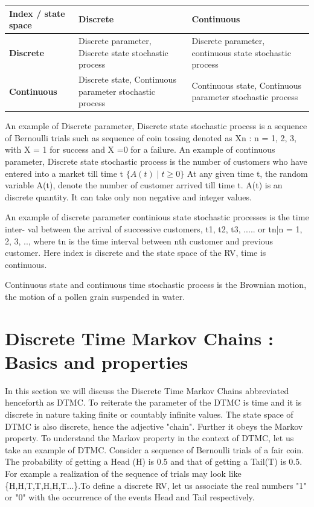 \begin{center}
 \begin{tabular}{||p{3cm}|p{5cm}|p{5cm}||} 
 \hline
 \textbf{Index / state space} & \textbf{Discrete} & \textbf{Continuous} \\ [0.5ex] 
 \hline\hline
 \textbf{Discrete} & Discrete parameter, Discrete state stochastic process & Discrete parameter,  continuous state stochastic process  \\ 
 \hline
 \textbf{Continuous} & Discrete state, Continuous parameter stochastic process & Continuous state, Continuous parameter stochastic process  \\
 \hline

 
\end{tabular}
\end{center}
An example of  Discrete parameter, Discrete state stochastic process is a sequence of Bernoulli trials such as sequence of coin tossing denoted as
{Xn : n = 1, 2, 3}, with X = 1 for success and X =0 for a failure.
An example of  continuous  parameter, Discrete state stochastic process   is  the number of customers who have entered into a market till time t
$\{A(t) \mid t \ge 0\}$
At any given time t, the random variable A(t), denote the number of customer arrived till time
t. A(t) is an discrete quantity. It can take only non negative and integer values.

An example of discrete parameter continious state stochastic processes is the time inter-
val between the arrival of successive customers, {t1, t2, t3, .....} or {tn|n = 1, 2, 3, ..}, where tn
is the time interval between nth customer and previous customer. Here index is discrete and the
state space of the RV, time is continuous.

Continuous state and continuous time stochastic process is the Brownian motion, the motion of a pollen grain suspended in water. 

\section{Discrete Time Markov Chains : Basics and properties}
In this section we will discuss the Discrete Time Markov Chains abbreviated henceforth as DTMC. To reiterate the parameter of the DTMC is time and it is discrete in nature taking finite or countably infinite values. The state space of DTMC is also discrete, hence the adjective "chain". Further it obeys the Markov property. To understand the Markov property in the context of DTMC, let us take an example of DTMC.
Consider a sequence of Bernoulli trials of a fair coin. The probability of getting a Head (H) is 0.5 and that of getting a Tail(T) is 0.5. For example a realization of the  sequence of trials may look like \{H,H,T,T,H,H,T...\}.To define a discrete RV, let us associate the real numbers "1" or "0"  with the occurrence of the events Head and Tail respectively. 

